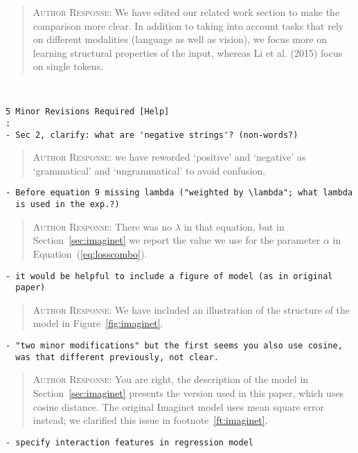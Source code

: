 \begin{quote}
\textsc{Author Response:} We have edited our related work section to make the comparison more 
clear. In addition to taking into account tasks that rely on different modalities (language as well as vision), 
we focus more on learning structural properties of the input, whereas Li et al. (2015) focus on single
tokens.
\end{quote}
\begin{verbatim}


5 Minor Revisions Required [Help]
: 
- Sec 2, clarify: what are 'negative strings'? (non-words?)
\end{verbatim}  
\begin{quote}
\textsc{Author Response:}  we have reworded `positive' and `negative' as `grammatical' 
and `ungrammatical' to avoid confusion.
\end{quote}
\begin{verbatim}
- Before equation 9 missing lambda ("weighted by \lambda"; what lambda
  is used in the exp.?)
\end{verbatim}  
\begin{quote}
\textsc{Author Response:}  There was no $\lambda$ in that equation, but in 
Section~\ref{sec:imaginet} we report the value we use for the parameter 
$\alpha$ in Equation~(\ref{eq:losscombo}).
\end{quote}
\begin{verbatim}
- it would be helpful to include a figure of model (as in original
  paper)
\end{verbatim}  
\begin{quote}
\textsc{Author Response:}  We have included an illustration of the structure of the 
model in Figure~\ref{fig:imaginet}.
\end{quote}
\begin{verbatim}
- "two minor modifications" but the first seems you also use cosine,
  was that different previously, not clear.
\end{verbatim}  
\begin{quote}
\textsc{Author Response:}  You are right, the description of the model in 
Section~\ref{sec:imaginet} presents the version used in this paper, which uses 
cosine distance. The original Imaginet model uses mean square error instead; 
we clarified this issue in footnote~\ref{ft:imaginet}.  
\end{quote}
\begin{verbatim}
- specify interaction features in regression model
\end{verbatim}  
